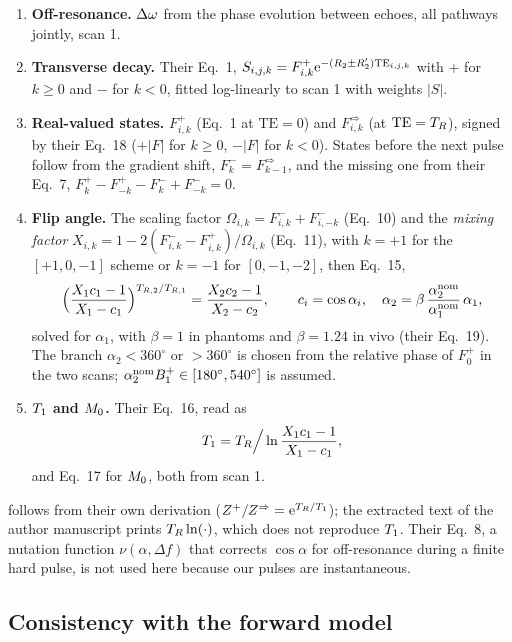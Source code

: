 \begin{enumerate}
\item \textbf{Off-resonance.} $\Delta\omega$ from the phase evolution between echoes, all pathways
  jointly, scan 1.
\item \textbf{Transverse decay.} Their Eq.~1,
  $S_{i,j,k}=F^+_{i,k}\mathrm{e}^{-(R_2\pm R_2')\mathrm{TE}_{i,j,k}}$ with $+$ for $k\ge0$ and $-$ for
  $k<0$, fitted log-linearly to scan 1 with weights $|S|$.
\item \textbf{Real-valued states.} $F^+_{i,k}$ (Eq.~1 at $\mathrm{TE}=0$) and $F^\Rightarrow_{i,k}$
  (at $\mathrm{TE}=T_R$), signed by their Eq.~18 ($+|F|$ for $k\ge0$, $-|F|$ for $k<0$).
  States before the next pulse follow from the gradient shift, $F^-_k=F^\Rightarrow_{k-1}$, and
  the missing one from their Eq.~7, $F^+_k-F^+_{-k}-F^-_k+F^-_{-k}=0$.
\item \textbf{Flip angle.} The scaling factor $\Omega_{i,k}=F^-_{i,k}+F^-_{i,-k}$ (Eq.~10) and
  the \emph{mixing factor} $X_{i,k}=1-2(F^-_{i,k}-F^+_{i,k})/\Omega_{i,k}$ (Eq.~11), with $k=+1$
  for the $[+1,0,-1]$ scheme or $k=-1$ for $[0,-1,-2]$, then Eq.~15,
  \begin{equation}
    \Bigl(\frac{X_1c_1-1}{X_1-c_1}\Bigr)^{T_{R,2}/T_{R,1}}=\frac{X_2c_2-1}{X_2-c_2},\qquad
    c_i=\cos\alpha_i,\quad \alpha_2=\beta\,\frac{\alpha_2^{\rm nom}}{\alpha_1^{\rm nom}}\,\alpha_1,
    \label{eq:p15}
  \end{equation}
  solved for $\alpha_1$, with $\beta=1$ in phantoms and $\beta=1.24$ in vivo (their Eq.~19).
  The branch $\alpha_2<360^\circ$ or $>360^\circ$ is chosen from the relative phase of $F^+_0$ in
  the two scans; $\alpha_2^{\rm nom}B_1^{+}\in[180^\circ,540^\circ]$ is assumed.
\item \textbf{$T_1$ and $M_0$.} Their Eq.~16, read as
  \begin{equation}
    T_1=T_R\Big/\ln\frac{X_1c_1-1}{X_1-c_1},
    \label{eq:p16}
  \end{equation}
  and Eq.~17 for $M_0$, both from scan 1.
\end{enumerate}

 follows from their own derivation ($Z^+/Z^\Rightarrow=\mathrm{e}^{T_R/T_1}$); the
extracted text of the author manuscript prints $T_R\ln(\cdot)$, which does not reproduce
$T_1$. Their Eq.~8, a nutation function $\nu(\alpha,\Delta f)$ that corrects $\cos\alpha$ for
off-resonance during a finite hard pulse, is not used here because our pulses are
instantaneous.

\subsection{Consistency with the forward model}

